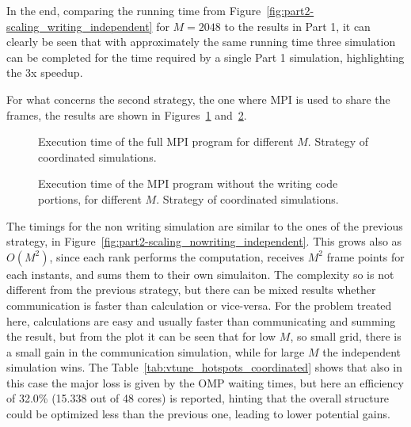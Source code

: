 In the end, comparing the running time from
Figure~\ref{fig:part2-scaling_writing_independent}
for $M = 2048$ to the results in Part 1, it can clearly be seen that
with approximately the same running time
three simulation can be completed for the time required by a single
Part 1 simulation, highlighting
the 3x speedup.

For what concerns the second strategy, the one where MPI is used to
share the frames,
the results are shown in
Figures~\ref{fig:part2-scaling_writing_coordinated}
and~\ref{fig:part2-scaling_nowriting_coordinated}.

\begin{figure}[h]
  \centering
  
  \caption{Execution time of the full MPI program for different $M$. Strategy of
  coordinated simulations.}
  \label{fig:part2-scaling_writing_coordinated}
\end{figure}

\begin{figure}[h]
  \centering
  
  \caption{Execution time of the MPI program without the writing code
    portions, for different $M$. Strategy of
  coordinated simulations.}
  \label{fig:part2-scaling_nowriting_coordinated}
\end{figure}

The timings for the non writing simulation are similar to the ones of
the previous strategy,
in Figure~\ref{fig:part2-scaling_nowriting_independent}. This grows
also as $O(M^2)$, since
each rank performs the computation, receives $M^2$ frame points for
each instants, and sums them to
their own simulaiton. The complexity so is not different from the
previous strategy, but there can be
mixed results whether communication is faster than calculation or
vice-versa. For the problem treated here,
calculations are easy and usually faster than communicating and
summing the result, but from the
plot it can be seen that for low $M$, so small grid, there is a small
gain in the communication simulation,
while for large $M$ the independent simulation wins. The
Table~\ref{tab:vtune_hotspots_coordinated}
shows that also in this case the major loss is given by the OMP waiting times,
but here an efficiency of 32.0\% (15.338 out of 48 cores) is
reported, hinting that
the overall structure could be optimized less than the previous one,
leading to lower potential gains.

